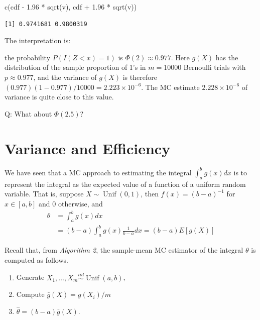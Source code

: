 \documentclass[
  letterpaper,
  DIV=11,
  numbers=noendperiod]{scrreprt}
\newenvironment{Shaded}{\begin{snugshade}}{\end{snugshade}}
\newcommand{\FloatTok}[1]{\textcolor[rgb]{0.68,0.00,0.00}{#1}}
\newcommand{\FunctionTok}[1]{\textcolor[rgb]{0.28,0.35,0.67}{#1}}
\newcommand{\NormalTok}[1]{\textcolor[rgb]{0.00,0.23,0.31}{#1}}
\newcommand{\SpecialCharTok}[1]{\textcolor[rgb]{0.37,0.37,0.37}{#1}}
\begin{document}
\begin{Shaded}
\begin{Highlighting}[]
\FunctionTok{c}\NormalTok{(cdf }\SpecialCharTok{{-}} \FloatTok{1.96} \SpecialCharTok{*} \FunctionTok{sqrt}\NormalTok{(v), cdf }\SpecialCharTok{+} \FloatTok{1.96} \SpecialCharTok{*} \FunctionTok{sqrt}\NormalTok{(v))}
\end{Highlighting}
\end{Shaded}

\begin{verbatim}
[1] 0.9741681 0.9800319
\end{verbatim}

The interpretation is:

the probability \(P (I(Z < x) = 1)\) is \(\Phi(2)\approx 0.977\). Here
\(g(X)\) has the distribution of the sample proportion of 1's in
\(m = 10000\) Bernoulli trials with \(p\approx 0.977\), and the variance
of \(g(X)\) is therefore
\((0.977)(1 − 0.977)/10000 =2.223 \times 10^{-6}\). The MC estimate
\(2.228\times 10^{-6}\) of variance is quite close to this value.

Q: What about \(\Phi(2.5)\)?

\section{Variance and Efficiency}\label{variance-and-efficiency}

We have seen that a MC approach to estimating the integral
\(\int_a^b g(x)dx\) is to represent the integral as the expected value
of a function of a uniform random variable. That is, suppose
\(X\sim \operatorname{Unif}(0,1)\), then \(f(x) = (b-a)^{-1}\) for
\(x\in[a,b]\) and 0 otherwise, and \[
\begin{aligned}
\theta & =\int_a^b g(x) d x \\
& =(b-a) \int_a^b g(x) \frac{1}{b-a} d x=(b-a) E[g(X)]
\end{aligned}
\]

Recall that, from \emph{Algorithm 2}, the sample-mean MC estimator of
the integral \(\theta\) is computed as follows.

\begin{enumerate}
\def\labelenumi{\arabic{enumi}.}
\item
  Generate
  \(X_1, \dots , X_m\overset{iid}{\sim}\operatorname{Unif}(a,b)\),
\item
  Compute \(\bar{g}(X) = g(X_i)/m\)
\item
  \(\hat{\theta}= (b − a)\bar{g}(X)\).
\end{enumerate}
\end{document}

